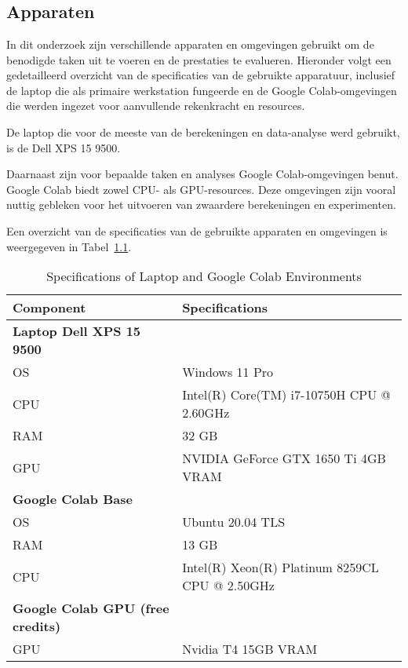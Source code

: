 
\chapter{}%
\label{ch:methodologie}

\section{Apparaten}
In dit onderzoek zijn verschillende apparaten en omgevingen gebruikt om de benodigde taken uit te voeren en de prestaties te evalueren. Hieronder volgt een gedetailleerd overzicht van de specificaties van de gebruikte apparatuur, inclusief de laptop die als primaire werkstation fungeerde en de Google Colab-omgevingen die werden ingezet voor aanvullende rekenkracht en resources.

De laptop die voor de meeste van de berekeningen en data-analyse werd gebruikt, is de Dell XPS 15 9500. 

Daarnaast zijn voor bepaalde taken en analyses Google Colab-omgevingen benut. Google Colab biedt zowel CPU- als GPU-resources. Deze omgevingen zijn vooral nuttig gebleken voor het uitvoeren van zwaardere berekeningen en experimenten.

Een overzicht van de specificaties van de gebruikte apparaten en omgevingen is weergegeven in Tabel~\ref{tab:specs}.

\begin{table}[h!]
    \centering
    \begin{tabular}{|l|l|}
        \hline
        \textbf{Component} & \textbf{Specifications} \\ \hline
        \textbf{Laptop Dell XPS 15 9500} & \\
        \quad OS & Windows 11 Pro \\
        \quad CPU & Intel(R) Core(TM) i7-10750H CPU @ 2.60GHz \\
        \quad RAM & 32 GB \\
        \quad GPU & NVIDIA GeForce GTX 1650 Ti 4GB VRAM \\ \hline
        \textbf{Google Colab Base} & \\
        \quad OS & Ubuntu 20.04 TLS \\
        \quad RAM & 13 GB \\
        \quad CPU & Intel(R) Xeon(R) Platinum 8259CL CPU @ 2.50GHz \\ \hline
        \textbf{Google Colab GPU (free credits)} & \\
        \quad GPU & Nvidia T4 15GB VRAM \\ \hline
    \end{tabular}
    \caption{Specifications of Laptop and Google Colab Environments}
    \label{tab:specs}
\end{table}


